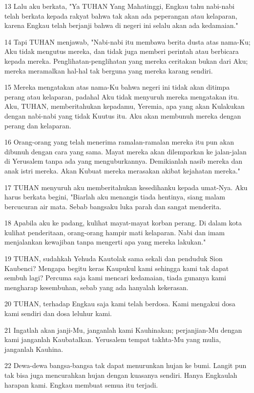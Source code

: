 \par 13 Lalu aku berkata, "Ya TUHAN Yang Mahatinggi, Engkau tahu nabi-nabi telah berkata kepada rakyat bahwa tak akan ada peperangan atau kelaparan, karena Engkau telah berjanji bahwa di negeri ini selalu akan ada kedamaian."
\par 14 Tapi TUHAN menjawab, "Nabi-nabi itu membawa berita dusta atas nama-Ku; Aku tidak mengutus mereka, dan tidak juga memberi perintah atau berbicara kepada mereka. Penglihatan-penglihatan yang mereka ceritakan bukan dari Aku; mereka meramalkan hal-hal tak berguna yang mereka karang sendiri.
\par 15 Mereka mengatakan atas nama-Ku bahwa negeri ini tidak akan ditimpa perang atau kelaparan, padahal Aku tidak menyuruh mereka mengatakan itu. Aku, TUHAN, memberitahukan kepadamu, Yeremia, apa yang akan Kulakukan dengan nabi-nabi yang tidak Kuutus itu. Aku akan membunuh mereka dengan perang dan kelaparan.
\par 16 Orang-orang yang telah menerima ramalan-ramalan mereka itu pun akan dibunuh dengan cara yang sama. Mayat mereka akan dilemparkan ke jalan-jalan di Yerusalem tanpa ada yang menguburkannya. Demikianlah nasib mereka dan anak istri mereka. Akan Kubuat mereka merasakan akibat kejahatan mereka."
\par 17 TUHAN menyuruh aku memberitahukan kesedihanku kepada umat-Nya. Aku harus berkata begini, "Biarlah aku menangis tiada hentinya, siang malam bercucuran air mata. Sebab bangsaku luka parah dan sangat menderita.
\par 18 Apabila aku ke padang, kulihat mayat-mayat korban perang. Di dalam kota kulihat penderitaan, orang-orang hampir mati kelaparan. Nabi dan imam menjalankan kewajiban tanpa mengerti apa yang mereka lakukan."
\par 19 TUHAN, sudahkah Yehuda Kautolak sama sekali dan penduduk Sion Kaubenci? Mengapa begitu keras Kaupukul kami sehingga kami tak dapat sembuh lagi? Percuma saja kami mencari kedamaian, tiada gunanya kami mengharap kesembuhan, sebab yang ada hanyalah kekerasan.
\par 20 TUHAN, terhadap Engkau saja kami telah berdosa. Kami mengakui dosa kami sendiri dan dosa leluhur kami.
\par 21 Ingatlah akan janji-Mu, janganlah kami Kauhinakan; perjanjian-Mu dengan kami janganlah Kaubatalkan. Yerusalem tempat takhta-Mu yang mulia, janganlah Kauhina.
\par 22 Dewa-dewa bangsa-bangsa tak dapat menurunkan hujan ke bumi. Langit pun tak bisa juga mencurahkan hujan dengan kuasanya sendiri. Hanya Engkaulah harapan kami. Engkau membuat semua itu terjadi.

